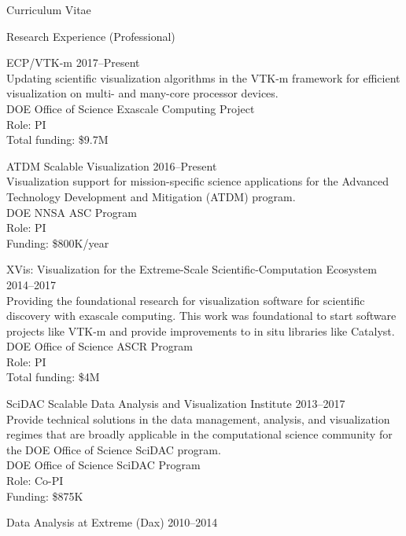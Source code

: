 \documentclass{article}
\begin{document}
\begin{cv}{Curriculum Vitae}

    \begin{cvlist}{Research Experience (Professional)}
    \item[ECP/VTK-m]\hfill 2017--Present\\
      Updating scientific visualization algorithms in the VTK-m framework for efficient visualization on multi- and many-core processor devices.\\
      DOE Office of Science Exascale Computing Project\\
      Role: PI\\
      Total funding: \$9.7M %
    \item[ATDM Scalable Visualization]\hfill 2016--Present\\
      Visualization support for mission-specific science applications for the Advanced Technology Development and Mitigation (ATDM) program.\\
      DOE NNSA ASC Program\\
      Role: PI\\
      Funding: \$800K/year
    \item[XVis: Visualization for the Extreme-Scale Scientific-Computation Ecosystem]\hfill 2014--2017\\
      Providing the foundational research for visualization software for scientific discovery with exascale computing. This work was foundational to start software projects like \mbox{VTK-m} and provide improvements to in situ libraries like Catalyst.
      DOE Office of Science ASCR Program\\
      Role: PI \\
      Total funding: \$4M
    \item[SciDAC Scalable Data Analysis and Visualization Institute]\hfill 2013--2017\\
      Provide technical solutions in the data management, analysis, and
      visualization regimes that are broadly applicable in the
      computational science community for the DOE Office of Science SciDAC program.\\
      DOE Office of Science SciDAC Program\\
      Role: Co-PI\\
      Funding: \$875K
    \item[Data Analysis at Extreme (Dax)]\hfill 2010--2014\\

\end{cvlist}
\end{cv}
\end{document}
